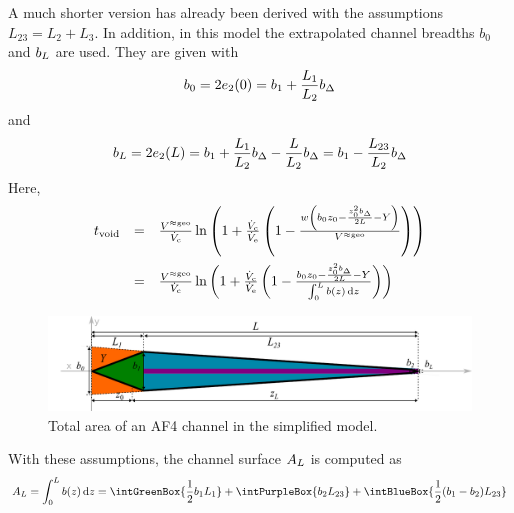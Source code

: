 A much shorter version has already been derived with the assumptions $L_{23} = L_2 
+ L_3$. %
In addition, in this model the extrapolated channel breadths $b_0$ and $b_L$ are used. They are given with
\begin{equation}
b_0 = 2e_2(0) = b_1+\frac{L_1}{L_2}b_\Delta 
\end{equation}
and
\begin{equation}
b_L = 2e_2(L) 
= b_1+\frac{L_1}{L_2}b_\Delta - \frac{L}{L_2}b_\Delta 
= b_1-\frac{L_{23}}{L_2}b_\Delta 
\end{equation}
Here, 
\begin{equation}
\begin{array}{lll}
\tvoid &= & \frac{\Vappgeo}{\Vc} \ln{
  \left(
  1 + \frac{\Vc}{\Ve}
  \left(
  1 - \frac{
    w 
    \left(
    b_0 z_0 
    - \frac{
      z_0^2 \bDelta
    }{
      2L} 
    - Y
    \right)
  }{\Vappgeo}
  \right)
  \right)}
\\\addlinespace
&= &\frac{\Vappgeo}{\Vc} \ln{
  \left(
  1 + \frac{\Vc}{\Ve}
  \left(
  1 - \frac{
    b_0 z_0 
    - \frac{
      z_0^2 \bDelta
    }{
      2L
    } 
    -  Y
  }{
 \int_{0}^{L} b(z) \diff z 
}
  \right)
  \right)}
\end{array}
\end{equation}
\begin{figure}[H]
  \begin{center}
    \includegraphics[width=\linewidth]{./images/fffSimplified.pdf}
    \vspace*{-3ex}    
  \end{center}
  \caption[Total area of an AF4 channel in the simplified model]{
    Total area of an AF4 channel in the simplified model.}
  \label{fig:fffSimplied}
\end{figure}
With these assumptions, the channel surface $A_L$ is computed as
\begin{equation}
\AL = \int_{0}^{L} b(z) \diff z 
= 
\intGreenBox{\ensuremath{\frac{1}{2} b_1 L_1}}
+ 
\intPurpleBox{\ensuremath{b_2 L_{23}}}
+
\intBlueBox{\ensuremath{\frac{1}{2} (b_1-b_2) L_{23}}}
\end{equation}
